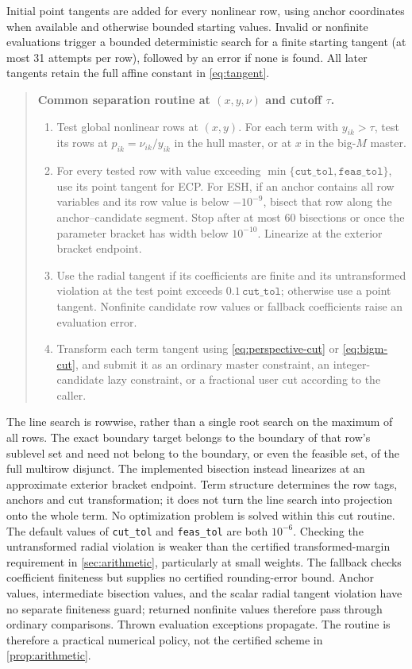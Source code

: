 Initial point tangents are added for every nonlinear row, using anchor coordinates when available and otherwise bounded starting values. Invalid or nonfinite evaluations trigger a bounded deterministic search for a finite starting tangent (at most 31 attempts per row), followed by an error if none is found. All later tangents retain the full affine constant in \eqref{eq:tangent}.

\begin{quote}
\textbf{Common separation routine at $(x,y,\nu)$ and cutoff $\tau$.}
\begin{enumerate}
 \item Test global nonlinear rows at $(x,y)$. For each term with $y_{ik}>\tau$, test its rows at $p_{ik}=\nu_{ik}/y_{ik}$ in the hull master, or at $x$ in the big-$M$ master.
 \item For every tested row with value exceeding $\min\{\texttt{cut\_tol},\texttt{feas\_tol}\}$, use its point tangent for ECP. For ESH, if an anchor contains all row variables and its row value is below $-10^{-9}$, bisect that row along the anchor--candidate segment. Stop after at most 60 bisections or once the parameter bracket has width below $10^{-10}$. Linearize at the exterior bracket endpoint.
 \item Use the radial tangent if its coefficients are finite and its untransformed violation at the test point exceeds $0.1\,\texttt{cut\_tol}$; otherwise use a point tangent. Nonfinite candidate row values or fallback coefficients raise an evaluation error.
 \item Transform each term tangent using \eqref{eq:perspective-cut} or \eqref{eq:bigm-cut}, and submit it as an ordinary master constraint, an integer-candidate lazy constraint, or a fractional user cut according to the caller.
\end{enumerate}
\end{quote}
The line search is rowwise, rather than a single root search on the maximum of all rows. The exact boundary target belongs to the boundary of that row's sublevel set and need not belong to the boundary, or even the feasible set, of the full multirow disjunct. The implemented bisection instead linearizes at an approximate exterior bracket endpoint. Term structure determines the row tags, anchors and cut transformation; it does not turn the line search into projection onto the whole term. No optimization problem is solved within this cut routine. The default values of \texttt{cut\_tol} and \texttt{feas\_tol} are both $10^{-6}$. Checking the untransformed radial violation is weaker than the certified transformed-margin requirement in \cref{sec:arithmetic}, particularly at small weights. The fallback checks coefficient finiteness but supplies no certified rounding-error bound. Anchor values, intermediate bisection values, and the scalar radial tangent violation have no separate finiteness guard; returned nonfinite values therefore pass through ordinary comparisons. Thrown evaluation exceptions propagate. The routine is therefore a practical numerical policy, not the certified scheme in \cref{prop:arithmetic}.

